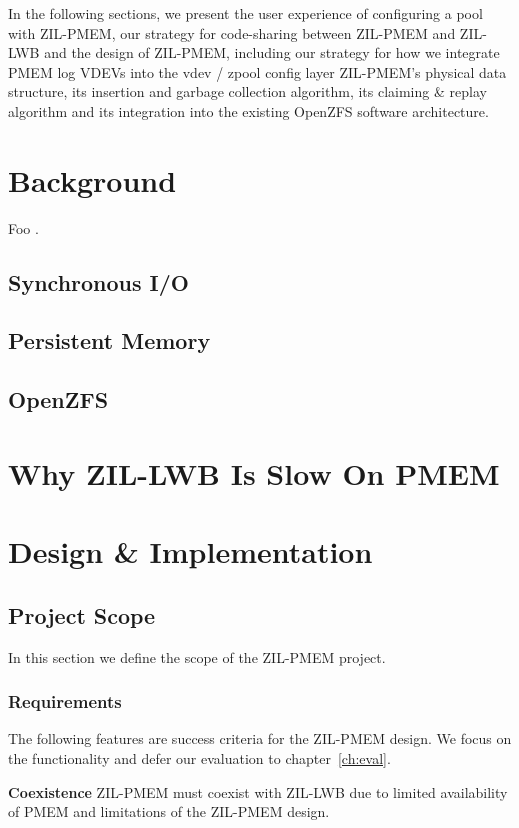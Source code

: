 \documentclass[12pt,a4paper,twoside,draft]{book}
\begin{document}
In the following sections, we present
the user experience of configuring a pool with ZIL-PMEM,
our strategy for code-sharing between ZIL-PMEM and ZIL-LWB and
the design of ZIL-PMEM, including
our strategy for how we integrate PMEM log VDEVs into the vdev / zpool config layer
ZIL-PMEM’s physical data structure,
its insertion and garbage collection algorithm,
its claiming & replay algorithm and
its integration into the existing OpenZFS software architecture.


\chapter{Background}
Foo \cite{kwon_strata_2017}.
\section{Synchronous I/O}
\section{Persistent Memory}
\section{OpenZFS}

\chapter{Why ZIL-LWB Is Slow On PMEM}\label{ch:lwb_analysis}

\chapter{Design \& Implementation}

\section{Project Scope}
In this section we define the scope of the ZIL-PMEM project.

\newcommand{\csgoal}[1]{\textbf{#1}}

\subsection{Requirements}
The following features are success criteria for the ZIL-PMEM design.
We focus on the functionality and defer our evaluation to chapter~\ref{ch:eval}.

\csgoal{Coexistence}
ZIL-PMEM must coexist with ZIL-LWB due to limited availability of PMEM and limitations of the ZIL-PMEM design.
\end{document}

